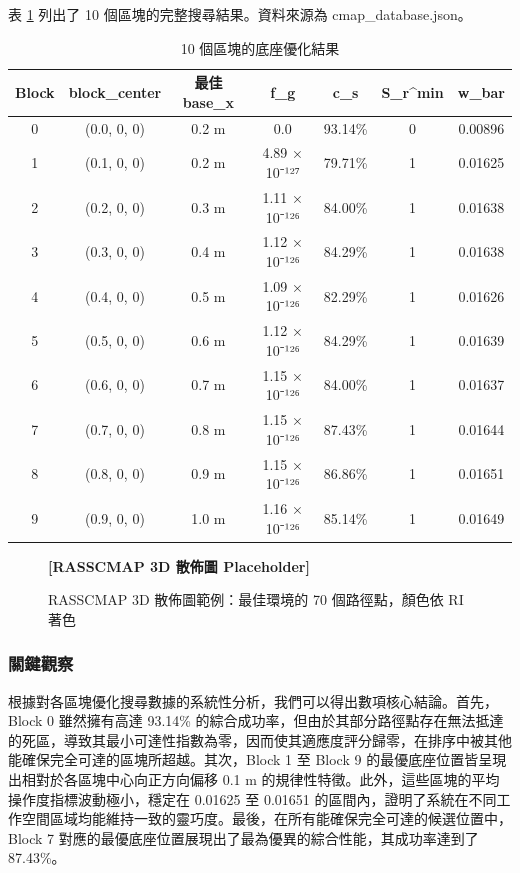 \documentclass[a4paper, 12pt]{article}
\begin{document}
表 \ref{tab:results} 列出了 10 個區塊的完整搜尋結果。資料來源為 cmap\_database.json。

\begin{table}[H]
\centering
\caption{10 個區塊的底座優化結果}
\label{tab:results}
\small
\begin{tabular}{ccccccc}
\toprule
\textbf{Block} & \textbf{block\_center} & \textbf{最佳 base\_x} & f\_g & c\_s & S\_r\^{}min & w\_bar \\
\midrule
0 & (0.0, 0, 0) & 0.2 m & 0.0 & 93.14\% & 0 & 0.00896 \\
1 & (0.1, 0, 0) & 0.2 m & 4.89 × 10⁻¹²⁷ & 79.71\% & 1 & 0.01625 \\
2 & (0.2, 0, 0) & 0.3 m & 1.11 × 10⁻¹²⁶ & 84.00\% & 1 & 0.01638 \\
3 & (0.3, 0, 0) & 0.4 m & 1.12 × 10⁻¹²⁶ & 84.29\% & 1 & 0.01638 \\
4 & (0.4, 0, 0) & 0.5 m & 1.09 × 10⁻¹²⁶ & 82.29\% & 1 & 0.01626 \\
5 & (0.5, 0, 0) & 0.6 m & 1.12 × 10⁻¹²⁶ & 84.29\% & 1 & 0.01639 \\
6 & (0.6, 0, 0) & 0.7 m & 1.15 × 10⁻¹²⁶ & 84.00\% & 1 & 0.01637 \\
7 & (0.7, 0, 0) & 0.8 m & 1.15 × 10⁻¹²⁶ & 87.43\% & 1 & 0.01644 \\
8 & (0.8, 0, 0) & 0.9 m & 1.15 × 10⁻¹²⁶ & 86.86\% & 1 & 0.01651 \\
9 & (0.9, 0, 0) & 1.0 m & 1.16 × 10⁻¹²⁶ & 85.14\% & 1 & 0.01649 \\
\bottomrule
\end{tabular}
\end{table}

\begin{figure}[H]
    \centering
    \textbf{[RASSCMAP 3D 散佈圖 Placeholder]}
    \caption{RASSCMAP 3D 散佈圖範例：最佳環境的 70 個路徑點，顏色依 RI 著色}
    \label{fig:scatter_plot}
\end{figure}

\subsubsection{關鍵觀察}

根據對各區塊優化搜尋數據的系統性分析，我們可以得出數項核心結論。首先，Block 0 雖然擁有高達 93.14\% 的綜合成功率，但由於其部分路徑點存在無法抵達的死區，導致其最小可達性指數為零，因而使其適應度評分歸零，在排序中被其他能確保完全可達的區塊所超越。其次，Block 1 至 Block 9 的最優底座位置皆呈現出相對於各區塊中心向正方向偏移 0.1 m 的規律性特徵。此外，這些區塊的平均操作度指標波動極小，穩定在 0.01625 至 0.01651 的區間內，證明了系統在不同工作空間區域均能維持一致的靈巧度。最後，在所有能確保完全可達的候選位置中，Block 7 對應的最優底座位置展現出了最為優異的綜合性能，其成功率達到了 87.43\%。
\end{document}
